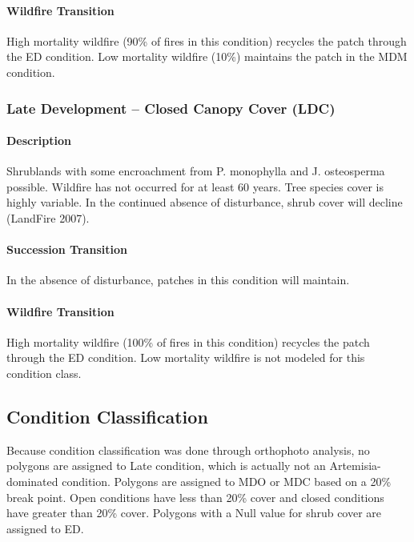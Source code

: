 \paragraph{Wildfire Transition} High mortality wildfire (90\% of fires in this condition) recycles the patch through the ED condition. Low mortality wildfire (10\%) maintains the patch in the MDM condition.

\noindent\hrulefill


\subsubsection{Late Development – Closed Canopy Cover (LDC)}

\paragraph{Description} Shrublands with some encroachment from P. monophylla and J. osteosperma possible. Wildfire has not occurred for at least 60 years. Tree species cover is highly variable. In the continued absence of disturbance, shrub cover will decline (LandFire 2007).

\paragraph{Succession Transition} In the absence of disturbance, patches in this condition will maintain. 

\paragraph{Wildfire Transition} High mortality wildfire (100\% of fires in this condition) recycles the patch through the ED condition. Low mortality wildfire is not modeled for this condition class.

\noindent\hrulefill

\subsection*{Condition Classification}
Because condition classification was done through orthophoto analysis, no polygons are assigned to Late condition, which is actually not an Artemisia-dominated condition. Polygons are assigned to MDO or MDC based on a 20\% break point. Open conditions have less than 20\% cover and closed conditions have greater than 20\% cover. Polygons with a Null value for shrub cover are assigned to ED.

